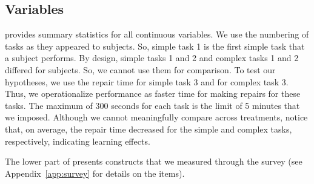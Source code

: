 \documentclass[msom,nonblindrev]{01 latex/class/informs3}
\begin{document}
\subsection{Variables}
 provides summary statistics for all continuous variables. We use the numbering of tasks as they appeared to subjects. So, simple task 1 is the first simple task that a subject performs. By design, simple tasks 1 and 2 and complex tasks 1 and 2 differed for subjects. So, we cannot use them for comparison. To test our hypotheses, we use the repair time for simple task 3 and for complex task 3. Thus, we operationalize performance as faster time for making repairs for these tasks. The maximum of 300 seconds for each task is the limit of 5 minutes that we imposed. Although we cannot meaningfully compare across treatments, notice that, on average, the repair time decreased for the simple and complex tasks, respectively, indicating learning effects.

The lower part of  presents constructs that we measured through the survey (see Appendix~\ref{app:survey} for details on the items). 
\end{document}
